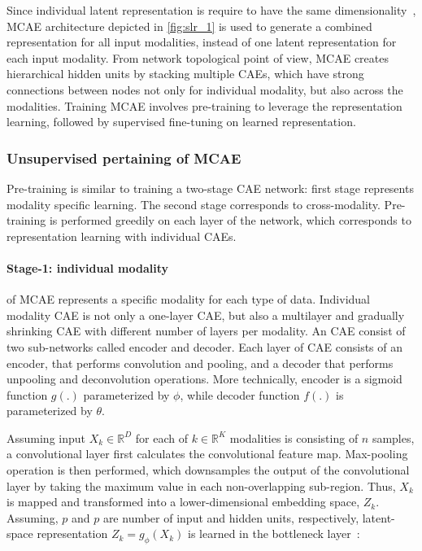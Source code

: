 \hspace*{3.5mm} Since individual latent representation is require to have the same dimensionality~\cite{mmdcae}, MCAE architecture depicted in \cref{fig:slr_1} is used to generate a combined representation for all input modalities, instead of one latent representation for each input modality. From network topological point of view, MCAE creates hierarchical hidden units by stacking multiple CAEs, which have strong connections between nodes not only for individual modality, but also across the modalities. Training MCAE involves pre-training to leverage the representation learning, followed by supervised fine-tuning on learned representation. 

\subsubsection{Unsupervised pertaining of MCAE} 
Pre-training is similar to training a two-stage CAE network: first stage represents modality specific learning. The second stage corresponds to cross-modality. Pre-training is performed greedily on each layer of the network, which corresponds to representation learning with individual CAEs. 

\paragraph{Stage-1: individual modality}\hspace{-3mm} of MCAE represents a specific modality for each type of data. Individual modality CAE is not only a one-layer CAE, but also a multilayer and gradually shrinking CAE with different number of layers per modality. An CAE consist of two sub-networks called encoder and decoder. Each layer of CAE consists of an encoder, that performs convolution and pooling, and a decoder that performs unpooling and deconvolution operations. More technically, encoder is a sigmoid function $g(.)$ parameterized by $\phi$, while decoder function $f(.)$ is parameterized by $\theta$. 

\hspace*{3.5mm} Assuming input $X_{k} \in \mathbb{R}^{D}$ for each of $k \in \mathbb{R}^K$ modalities is consisting of $n$ samples, a convolutional layer first calculates the convolutional feature map. Max-pooling operation is then performed, which downsamples the output of the convolutional layer by taking the maximum value in each non-overlapping sub-region. Thus, $X_{k}$ is mapped and transformed into a lower-dimensional embedding space, $Z_k$. Assuming, $p$ and $p$ are number of input and hidden units, respectively, latent-space representation $Z_k=g_{\phi}(X_{k})$ is learned in the bottleneck layer~\cite{mmdcae}: 

